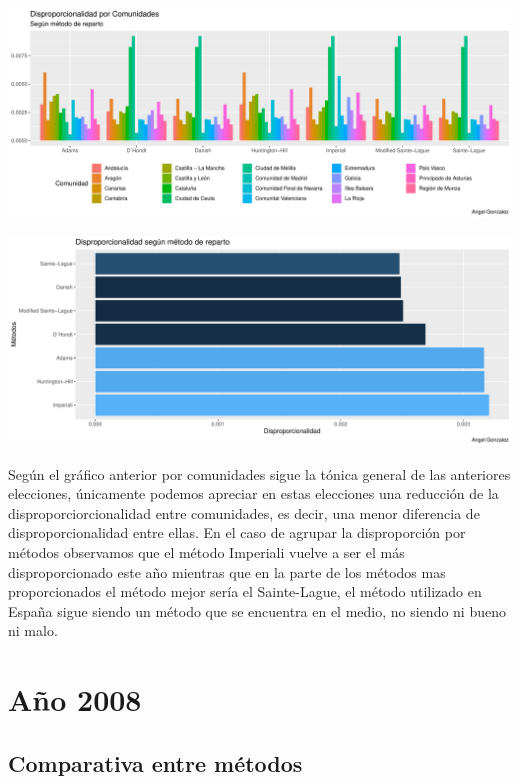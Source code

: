 \documentclass[12pt,a4paper,]{book}
\numberwithin{dummy}{section}
\theoremstyle{ocrenumbox}
\theoremstyle{blacknumex}
\theoremstyle{blacknumbox}
\theoremstyle{ocrenum}
\theoremstyle{ocrenum}
\begin{document}
\begin{center}\includegraphics[width=0.95\linewidth]{figurasR/unnamed-chunk-132-1} \end{center}

\begin{center}\includegraphics[width=0.95\linewidth]{figurasR/unnamed-chunk-132-2} \end{center}

Según el gráfico anterior por comunidades sigue la tónica general de las
anteriores elecciones, únicamente podemos apreciar en estas elecciones
una reducción de la disproporciorcionalidad entre comunidades, es decir,
una menor diferencia de disproporcionalidad entre ellas. En el caso de
agrupar la disproporción por métodos observamos que el método Imperiali
vuelve a ser el más disproporcionado este año mientras que en la parte
de los métodos mas proporcionados el método mejor sería el Sainte-Lague,
el método utilizado en España sigue siendo un método que se encuentra en
el medio, no siendo ni bueno ni malo.

\hypertarget{auxf1o-2008}{%
\section{Año 2008}\label{auxf1o-2008}}

\hypertarget{comparativa-entre-muxe9todos-9}{%
\subsection{Comparativa entre
métodos}\label{comparativa-entre-muxe9todos-9}}
\end{document}
